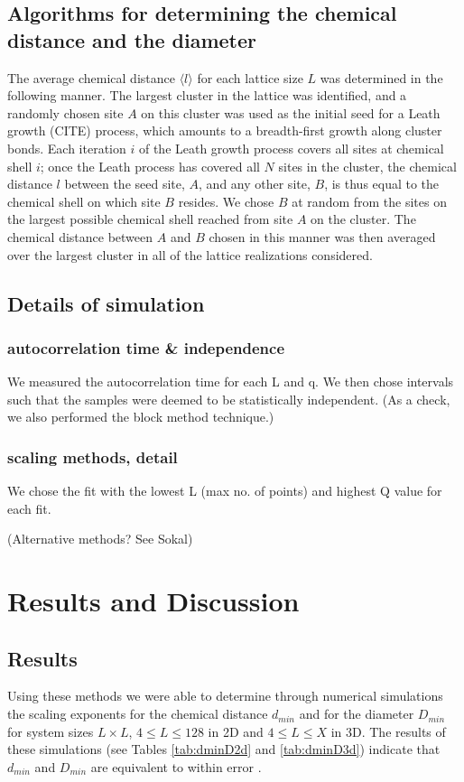 \documentclass[pre,preprint]{revtex4}
\begin{document}
\subsection{Algorithms for determining the chemical distance and the diameter} %

The average chemical distance $\langle l \rangle$ for each lattice size $L$ was determined in the following manner. The largest cluster in the lattice was identified, and a randomly chosen site $A$ on this cluster was used as the initial seed for a Leath growth (CITE) process, which amounts to a breadth-first growth along cluster bonds.   Each iteration $i$ of the Leath growth process covers all sites at chemical shell $i$;  once the Leath process has covered all $N$ sites in the cluster, the chemical distance $l$ between the seed site, $A$, and any other site, $B$, is thus equal to the chemical shell on which site $B$ resides.  We chose $B$ at random from the sites on the largest possible chemical shell reached from site $A$ on the cluster.  The chemical distance between $A$ and $B$ chosen in this manner was then averaged over the largest cluster in all of the lattice realizations considered.  
\subsection{Details of simulation}

\subsubsection{autocorrelation time \& independence}
We measured the autocorrelation time for each L and q.  We then chose intervals such that the samples were deemed to be statistically independent.
(As a check, we also performed the block method technique.)

\subsubsection{scaling methods, detail}
We chose the fit with the lowest L (max no. of points) and highest Q value for each fit.

(Alternative methods? See Sokal)

\section{Results and Discussion}

\subsection{Results}
Using these methods we were able to determine through numerical simulations the scaling exponents for the chemical distance $d_{min}$ and for the diameter $D_{min}$ for system sizes $L \times  L$, $4 \le L \le 128$ in 2D and   $4 \le L \le X$ in 3D.  The results of these simulations (see Tables \ref{tab:dminD2d} and \ref{tab:dminD3d}) indicate that $d_{min}$ and $D_{min}$ are equivalent to within error .  
\end{document}
